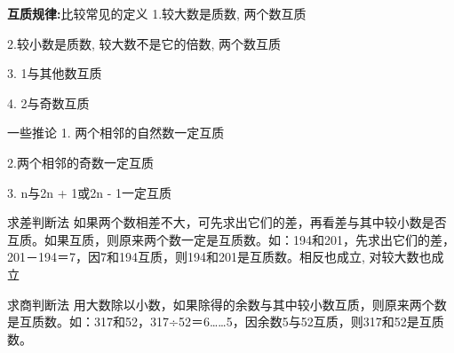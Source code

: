 \small {
\textbf{互质规律:}比较常见的定义
1.较大数是质数, 两个数互质

2.较小数是质数, 较大数不是它的倍数, 两个数互质

3. 1与其他数互质

4. 2与奇数互质

一些推论
1. 两个相邻的自然数一定互质

2.两个相邻的奇数一定互质

3. n与2n + 1或2n - 1一定互质

求差判断法
如果两个数相差不大，可先求出它们的差，再看差与其中较小数是否互质。如果互质，则原来两个数一定是互质数。如：194和201，先求出它们的差，201－194＝7，因7和194互质，则194和201是互质数。相反也成立, 对较大数也成立

求商判断法
用大数除以小数，如果除得的余数与其中较小数互质，则原来两个数是互质数。如：317和52，317÷52＝6……5，因余数5与52互质，则317和52是互质数。\\

}